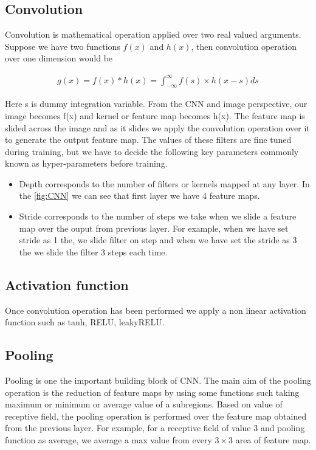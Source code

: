 \subsection{Convolution}

Convolution is mathematical operation applied over two real valued arguments. Suppose we have two functions $f(x)$ and $h(x)$, then convolution operation over one dimension would be 

 \begin{equation}\label{eq:convolution-1d}
        \begin{aligned}
            g(x)=f(x) \ast h(x) = \int_{-\infty }^{\infty} f(s) \times h(x-s) ds
        \end{aligned}
\end{equation}

Here s is dummy integration variable. 
From the CNN and image perspective, our image becomes f(x) and kernel or feature map becomes h(x). The feature map is slided across the image and as it slides we apply the convolution operation over it to generate the output feature map. The values of these filters are fine tuned during training, but we have to decide the following key parameters commonly known as hyper-parameters before training.
\begin{itemize}
    \item  Depth corresponds to the number of filters or kernels mapped at any layer. In the \cref{fig:CNN} we can see that first layer we have 4 feature maps.
    \item Stride corresponds to the number of steps we take when we slide a feature map over the ouput from previous layer. For example, when we have set stride as 1 the, we slide filter on step and when we have set the stride as 3 the we slide the filter 3 steps each time.
\end{itemize}

\subsection{ Activation function}
Once convolution operation has been performed we apply a non linear activation function such as tanh, RELU, leakyRELU.

\subsection{Pooling}
Pooling is one the important building block of CNN. The main aim of the pooling operation is the reduction of feature maps by using some functions such taking maximum or minimum or average value of a subregions. Based on value of receptive field, the pooling operation is performed over the feature map obtained from the previous layer. For example, for a receptive field of value 3 and pooling function as average, we average a max value from every $3 \times 3$ area of feature map.

